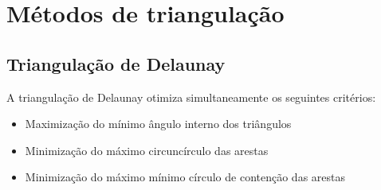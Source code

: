 







\section{Métodos de triangulação}
\subsection{Triangulação de Delaunay}
A triangulação de Delaunay otimiza simultaneamente os seguintes critérios:
\begin{itemize}
    \item Maximização do mínimo ângulo interno dos triângulos
    \item Minimização do máximo circuncírculo das arestas
    \item Minimização do máximo mínimo círculo de contenção das arestas
\end{itemize}

